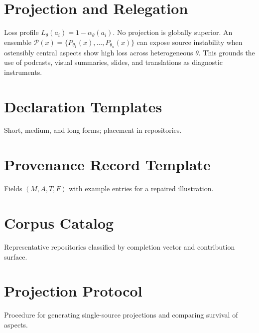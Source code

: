 \documentclass[11pt,openany]{book}
\begin{document}
\chapter{Projection and Relegation}
Loss profile $L_\theta(a_i)=1-\alpha_\theta(a_i)$. No projection is
globally superior. An ensemble $\mathcal P(x)=\{P_{\theta_1}(x),\ldots,
P_{\theta_n}(x)\}$ can expose source instability when ostensibly central
aspects show high loss across heterogeneous $\theta$. This grounds the use
of podcasts, visual summaries, slides, and translations as diagnostic
instruments.

\chapter{Declaration Templates}
Short, medium, and long forms; placement in repositories.

\chapter{Provenance Record Template}
Fields $(M,A,T,F)$ with example entries for a repaired illustration.

\chapter{Corpus Catalog}
Representative repositories classified by completion vector and
contribution surface.

\chapter{Projection Protocol}
Procedure for generating single-source projections and comparing survival
of aspects.

\end{document}
